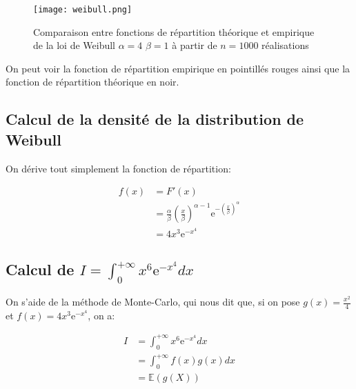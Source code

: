 \documentclass{article}
\begin{document}
\begin{multicols}{2}
\begin{figure}[H]
    \begin{center}
        \texttt{[image: weibull.png]}
        \centering
        \captionsetup{justification=centering}
        \caption{\label{fig:weibull}Comparaison entre fonctions de répartition théorique et empirique de la loi de Weibull $\alpha = 4$ $\beta = 1$ à partir de $n = 1000$ réalisations}
    \end{center}
\end{figure}

On peut voir la fonction de répartition empirique en pointillés rouges ainsi que
la fonction de répartition théorique en noir.

\subsection{Calcul de la densité de la distribution de Weibull}\label{subsec:ex12}

On dérive tout simplement la fonction de répartition:

\begin{equation}
    \begin{split}
        f(x) &= F'(x) \\
             &= \frac{\alpha}{\beta}\left(\frac{x}{\beta}\right)^{\alpha - 1}\mathrm{e}^{-\left(\frac{x}{\beta}\right)^{\alpha}} \\
             &= 4 x^3 \mathrm{e}^{-x^4}
    \end{split}
\end{equation}

\subsection{Calcul de $I = \int_0^{+\infty} x^6 \mathrm{e}^{-x^4} dx$}\label{subsec:ex13}

On s'aide de la méthode de Monte-Carlo, qui nous dit que, si on pose
$g(x) = \frac{x^2}{4}$ et $f(x) = 4 x^3 \mathrm{e}^{-x^4}$, on a:

\begin{equation}
    \begin{split}
        I &= \int_0^{+\infty} x^6 \mathrm{e}^{-x^4} dx \\
          &= \int_0^{+\infty} f(x) g(x) dx \\
          &= \mathbb{E}(g(X))
    \end{split}
\end{equation}


\end{multicols}
\end{document}
